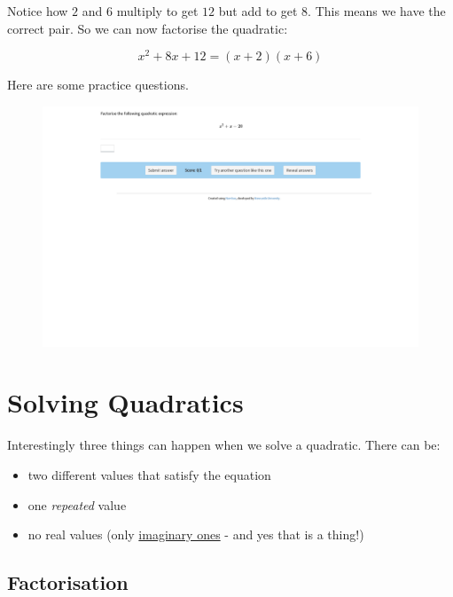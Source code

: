 \documentclass[
  a4paper,
]{scrbook}
\providecommand{\tightlist}{%
  \setlength{\itemsep}{0pt}\setlength{\parskip}{0pt}}\usepackage{longtable,booktabs,array}
\begin{document}
Notice how \(2\) and \(6\) multiply to get \(12\) but add to get \(8\).
This means we have the correct pair. So we can now factorise the
quadratic:

\[
x^2 + 8x +12 = (x+2)(x+6)
\]

Here are some practice questions.

\begin{figure}

{\centering 

\href{https://numbas.mathcentre.ac.uk/question/64384/quadratics-factorisation-1/embed/?token=1e79515a-591e-457e-afe3-d82103bb02e9}{\includegraphics{./07-quadratics_files/figure-pdf/unnamed-chunk-2-1.png}}

}

\end{figure}

\hypertarget{solving-quadratics}{%
\section{Solving Quadratics}\label{solving-quadratics}}

Interestingly three things can happen when we solve a quadratic. There
can be:

\begin{itemize}
\tightlist
\item
  two different values that satisfy the equation
\item
  one \emph{repeated} value
\item
  no real values (only
  \href{https://en.wikipedia.org/wiki/Imaginary_number}{imaginary ones}
  - and yes that is a thing!)
\end{itemize}

\hypertarget{factorisation}{%
\subsection{Factorisation}\label{factorisation}}
\end{document}
